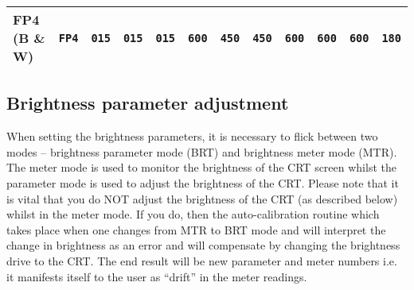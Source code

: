 \begin{table}[htb]
\begin{center}
\begin{tabular}{|l|l|c|c|c|c|c|c|c|c|c|c|}
%
%
%
{FP4 (B \& W)} & {\tt FP4} & {\tt 015}  & {\tt 015} & {\tt 015}
& {\tt 600} & {\tt 450} & {\tt 450} & {\tt 600} & {\tt 600} & {\tt 600} &
{\tt 180} \\
\hline
\end {tabular}
\end {center}
\end {table}

\subsection {\bf Brightness parameter adjustment}

When setting the brightness parameters, it is necessary to flick between two
modes -- brightness parameter mode (BRT) and brightness meter mode (MTR). The
meter mode is used to monitor the brightness of the CRT screen whilst the
parameter mode is used to adjust the brightness of the CRT. Please note that it
is vital that you do NOT adjust the brightness of the CRT (as described below)
whilst in the meter mode. If you do, then the auto-calibration routine which
takes place when one changes from MTR to BRT mode and will interpret the
change in brightness as an error and will compensate by changing the brightness
drive to the CRT. The end result will be new parameter and meter numbers
i.e. it manifests itself to the user as ``drift'' in the meter readings.

